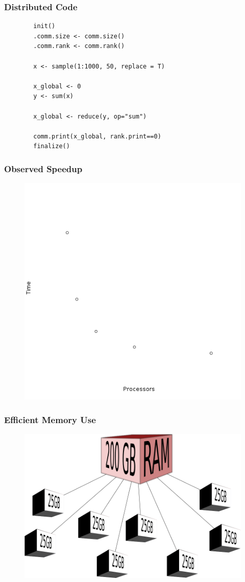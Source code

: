 \begin{frame}[fragile]
		\frametitle{Distributed Code}
		\begin{verbatim}
		init()
		.comm.size <- comm.size()
		.comm.rank <- comm.rank()

		x <- sample(1:1000, 50, replace = T)

		x_global <- 0
		y <- sum(x)

		x_global <- reduce(y, op="sum")

		comm.print(x_global, rank.print==0)
		finalize()
		\end{verbatim}
\end{frame}

\begin{frame}
		\frametitle{Observed Speedup}
			\begin{figure}
					\includegraphics[width=0.65\linewidth]{figures/mpi/mpi}
			\end{figure}
\end{frame}

\begin{frame}
		\frametitle{Efficient Memory Use}
		\begin{figure}
				\includegraphics[width=0.8\linewidth]{figures/diagrams/splitmem/memsplit}
		\end{figure}
\end{frame}

